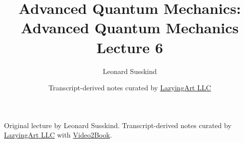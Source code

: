 \documentclass[11pt,oneside]{book}
\begin{document}
\frontmatter
\title{Advanced Quantum Mechanics: Advanced Quantum Mechanics Lecture 6}
\author{Leonard Susskind}
\date{Transcript-derived notes curated by \href{https://lazying.art}{LazyingArt LLC}}
\maketitle
\begin{center}
\small Original lecture by Leonard Susskind. Transcript-derived notes curated by \href{https://lazying.art}{LazyingArt LLC} with \href{https://github.com/lachlanchen/Video2Book}{Video2Book}.
\end{center}
\clearpage
\mainmatter

\end{document}
